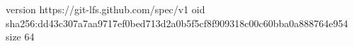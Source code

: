 version https://git-lfs.github.com/spec/v1
oid sha256:dd43c307a7aa9717ef0bed713d2a0b5f5cf8f909318c00c60bba0a888764e954
size 64
